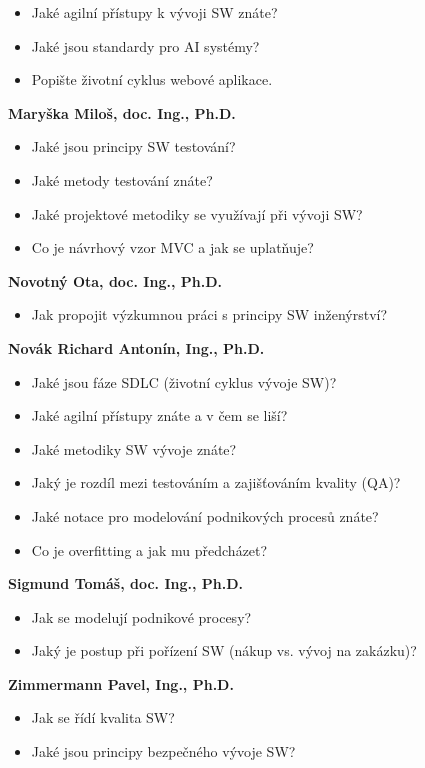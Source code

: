 \begin{profesorbox}
\begin{itemize}
  \item Jaké agilní přístupy k vývoji SW znáte?
  \item Jaké jsou standardy pro AI systémy?
  \item Popište životní cyklus webové aplikace.
\end{itemize}
\textbf{Maryška Miloš, doc. Ing., Ph.D.}
\begin{itemize}
  \item Jaké jsou principy SW testování?
  \item Jaké metody testování znáte?
  \item Jaké projektové metodiky se využívají při vývoji SW?
  \item Co je návrhový vzor MVC a jak se uplatňuje?
\end{itemize}
\textbf{Novotný Ota, doc. Ing., Ph.D.}
\begin{itemize}
  \item Jak propojit výzkumnou práci s principy SW inženýrství?
\end{itemize}
\textbf{Novák Richard Antonín, Ing., Ph.D.}
\begin{itemize}
  \item Jaké jsou fáze SDLC (životní cyklus vývoje SW)?
  \item Jaké agilní přístupy znáte a v čem se liší?
  \item Jaké metodiky SW vývoje znáte?
  \item Jaký je rozdíl mezi testováním a zajišťováním kvality (QA)?
  \item Jaké notace pro modelování podnikových procesů znáte?
  \item Co je overfitting a jak mu předcházet?
\end{itemize}
\textbf{Sigmund Tomáš, doc. Ing., Ph.D.}
\begin{itemize}
  \item Jak se modelují podnikové procesy?
  \item Jaký je postup při pořízení SW (nákup vs. vývoj na zakázku)?
\end{itemize}
\textbf{Zimmermann Pavel, Ing., Ph.D.}
\begin{itemize}
  \item Jak se řídí kvalita SW?
  \item Jaké jsou principy bezpečného vývoje SW?
\end{itemize}
\end{profesorbox}
